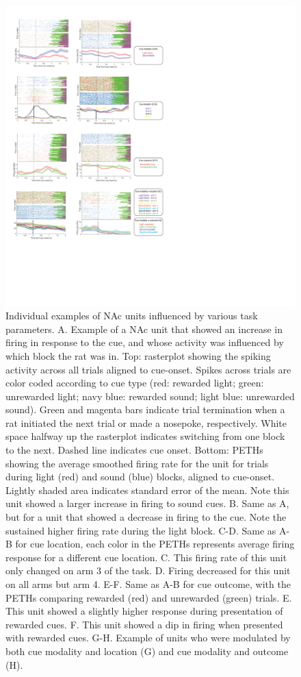 \documentclass[11pt]{article}
\begin{document}
\begin{figure}[h]
\centering
\includegraphics[width=\textwidth]{Fig 5 - Neural examples.png}
\caption{Individual examples of NAc units influenced by various task parameters. A. Example of a NAc unit that showed an increase in firing in response to the cue, and whose activity was influenced by which block the rat was in. Top: rasterplot showing the spiking activity across all trials aligned to cue-onset. Spikes across trials are color coded according to cue type (red: rewarded light; green: unrewarded light; navy blue: rewarded sound; light blue: unrewarded sound). Green and magenta bars indicate trial termination when a rat initiated the next trial or made a nosepoke, respectively. White space halfway up the rasterplot indicates switching from one block to the next. Dashed line indicates cue onset. Bottom: PETHs showing the average smoothed firing rate for the unit for trials during light (red) and sound (blue) blocks, aligned to cue-onset. Lightly shaded area indicates standard error of the mean. Note this unit showed a larger increase in firing to sound cues. B. Same as A, but for a unit that showed a decrease in firing to the cue. Note the sustained higher firing rate during the light block. C-D. Same as A-B for cue location, each color in the PETHs represents average firing response for a different cue location. C. This firing rate of this unit only changed on arm 3 of the task. D. Firing decreased for this unit on all arms but arm 4. E-F. Same as A-B for cue outcome, with the PETHs comparing rewarded (red) and unrewarded (green) trials. E. This unit showed a slightly higher response during presentation of rewarded cues. F. This unit showed a dip in firing when presented with rewarded cues. G-H. Example of units who were modulated by both cue modality and location (G) and cue modality and outcome (H).}
\label{fig:examples}
\end{figure}
\end{document}
